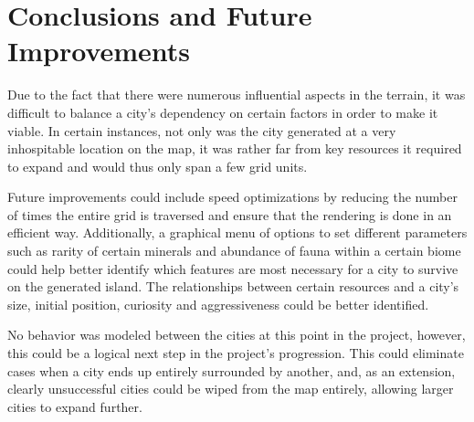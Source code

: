 \section{Conclusions and Future Improvements}
Due to the fact that there were numerous influential aspects in the terrain, it was difficult to balance a city's dependency on certain factors in order to make it viable. In certain instances, not only was the city generated at a very inhospitable location on the map, it was rather far from key resources it required to expand and would thus only span a few grid units. 

Future improvements could include speed optimizations by reducing the number of times the entire grid is traversed and ensure that the rendering is done in an efficient way. Additionally, a graphical menu of options to set different parameters such as rarity of certain minerals and abundance of fauna within a certain biome could help better identify which features are most necessary for a city to survive on the generated island. The relationships between certain resources and a city's size, initial position, curiosity and aggressiveness could be better identified. 

No behavior was modeled between the cities at this point in the project, however, this could be a logical next step in the project's progression. This could eliminate cases when a city ends up entirely surrounded by another, and, as an extension, clearly unsuccessful cities could be wiped from the map entirely, allowing larger cities to expand further.



